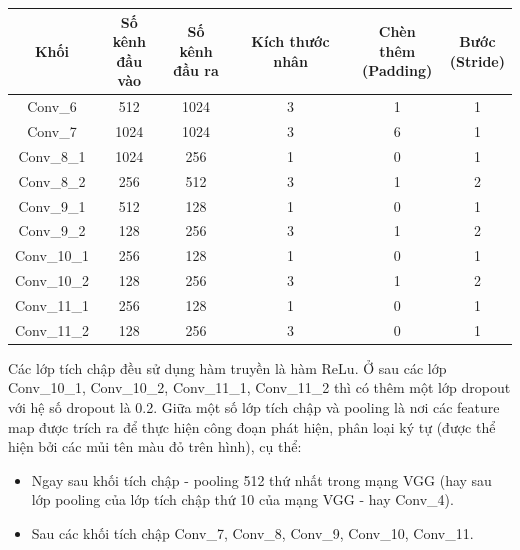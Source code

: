 \documentclass[a4paper]{article}
\theoremstyle{definition}
\begin{document}
	\begin{center}
		\begin{tabular}{||c | c | c | c | c | c ||} 
			\hline
			Khối & \makecell{ Số kênh \\ đầu vào } & \makecell{ Số kênh \\ đầu ra} & Kích thước nhân &  \makecell{ Chèn thêm \\ (Padding) } &  \makecell{ Bước \\ (Stride) } \\ [0.5ex] 
			\hline\hline
			Conv\_6 & 512 & 1024 & 3 & 1 & 1 \\ 
			\hline
			Conv\_7 & 1024 & 1024 & 3 & 6 & 1 \\ 
			\hline
			Conv\_8\_1 & 1024 & 256 & 1 & 0 & 1 \\ 
			\hline
			Conv\_8\_2 & 256 & 512 & 3 & 1 & 2 \\ 
			\hline
			Conv\_9\_1 & 512 & 128 & 1 & 0 & 1 \\ 
			\hline
			Conv\_9\_2 & 128 & 256 & 3 & 1 & 2 \\ 
			\hline
			Conv\_10\_1 & 256 & 128 & 1 & 0 & 1 \\ 
			\hline
			Conv\_10\_2 & 128 & 256 & 3 & 1 & 2 \\ 
			\hline
			Conv\_11\_1 & 256 & 128 & 1 & 0 & 1 \\ 
			\hline
			Conv\_11\_2 & 128 & 256 & 3 & 0 & 1 \\ 
			\hline
		\end{tabular}
	\end{center}
	
	
	Các lớp tích chập đều sử dụng hàm truyền là hàm ReLu\cite{relu}. Ở sau các lớp Conv\_10\_1, Conv\_10\_2, Conv\_11\_1, Conv\_11\_2 thì có thêm một lớp dropout\cite{srivastava2014dropout} với hệ số dropout là 0.2. Giữa một số lớp tích chập và pooling là nơi các feature map được trích ra để thực hiện công đoạn phát hiện, phân loại ký tự (được thể hiện bởi các mủi tên màu đỏ trên hình), cụ thể:
	
	\begin{itemize}
		\item Ngay sau khối tích chập - pooling 512 thứ nhất trong mạng VGG\cite{simonyan2014very} (hay sau lớp pooling của lớp tích chập thứ 10 của mạng VGG\cite{simonyan2014very} - hay Conv\_4).
		\item Sau các khối tích chập Conv\_7, Conv\_8, Conv\_9, Conv\_10, Conv\_11.
	\end{itemize}
	
\end{document}

